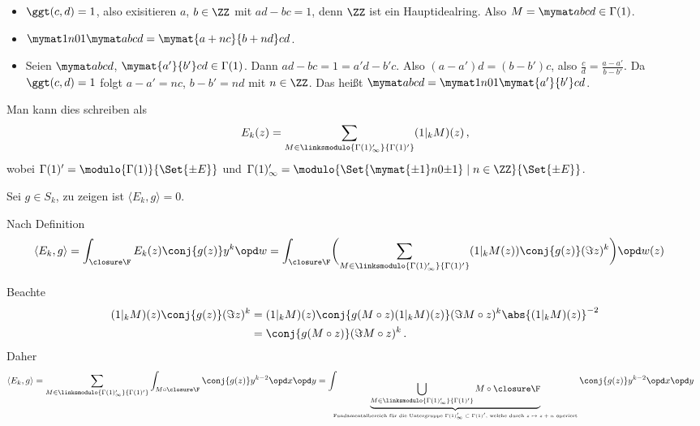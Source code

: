 \begin{bewe}
\begin{bewe}
	\begin{itemize}
		\item $\ggt(c,d) = 1$, also exisitieren $a$, $b \in \ZZ$ mit $ad - bc = 1$, denn $\ZZ$ ist ein Hauptidealring.
		Also $M = \mymat abcd \in \Gamma(1)$.
		
		\item $\mymat 1n01 \mymat abcd = \mymat {a+nc}{b+nd}c{d}$.
		
		\item Seien $\mymat abcd$, $\mymat {a'}{b'}cd \in \Gamma(1)$. Dann $ad-bc = 1 = a'd-b'c$.
		Also $(a-a') d = (b-b')c$, also $\frac{c}{d} = \frac{a-a'}{b-b'}$.
		Da $\ggt(c,d) = 1$ folgt $a-a' = nc$, $b-b' = nd$ mit $n \in \ZZ$.
		Das heißt $\mymat abcd = \mymat 1n01 \mymat{a'}{b'}cd$.
	\end{itemize}
\end{bewe}

	Man kann dies schreiben als
	\[
		E_k(z)
		= \sum_{M \in \linksmodulo{\Gamma(1)_\infty'}{\Gamma(1)'}} (1|_k M)(z)\,,
	\]
	wobei $\Gamma(1)' = \modulo{\Gamma(1)}{\Set{\pm E}}$ und $\Gamma(1)'_\infty = \modulo{\Set{\mymat{\pm1}n0{\pm1}} \mid n \in \ZZ}{\Set{\pm E}}$.
	
	Sei $g \in S_k$, zu zeigen ist $\langle E_k, g \rangle = 0$.
	
	Nach Definition
	\begin{align*}
		\langle E_k, g \rangle &= \int_{\closure \F} E_k(z) \conj{g(z)} y^k \opd w
		= \int_{\closure \F} \biggl(\sum_{M \in \linksmodulo{\Gamma(1)_\infty'}{\Gamma(1)'}} (1|_kM(z)) \conj{g(z)} (\Im z)^k \biggr) \opd w(z)
	\end{align*}
	
	Beachte
	\begin{align*}
		(1|_k M)(z) \conj{g(z)}(\Im z)^k
		&= (1|_kM)(z) \conj{g(M \circ z) (1|_kM)(z)} (\Im M \circ z)^k \abs{(1|_kM)(z)}^{-2}\\
		&= \conj{g(M \circ z)} (\Im M \circ z)^k
		\,.
	\end{align*}
	Daher
	\begin{align*}
		\langle E_k, g \rangle
		&= \sum_{M \in \linksmodulo{\Gamma(1)_\infty'}{\Gamma(1)'}} \int_{M \circ \closure \F} \conj{g(z)} y^{k-2} \opd x \opd y %
		= \int_{\underbrace{\bigcup_{M \in \linksmodulo{\Gamma(1)_\infty'}{\Gamma(1)'}} M \circ \closure\F}_{\text{Fundamentalbereich für die Untergruppe $\Gamma(1)'_\infty \subset \Gamma(1)'$, welche durch $z \mapsto z+n$ operiert}}} \conj{g(z)} y^{k-2} \opd x \opd y
	\end{align*}
	

\end{bewe}
